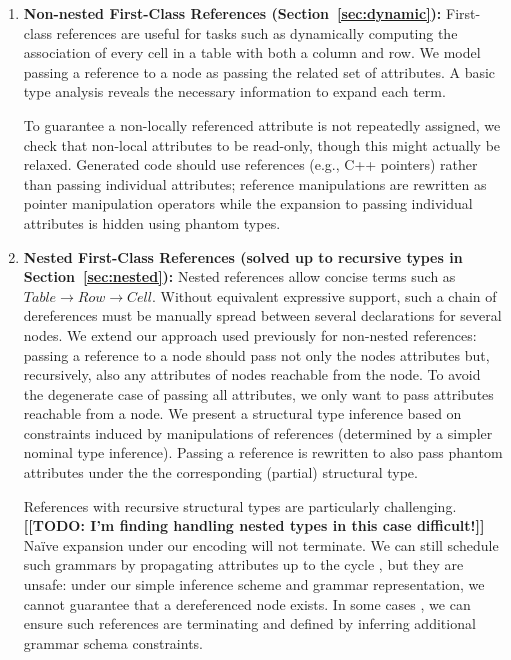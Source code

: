 \begin{enumerate}

\item \textbf{Non-nested First-Class References (Section~\ref{sec:dynamic}):} First-class references are useful for tasks such as dynamically computing the association of every cell in a table with both a column and row. We model passing a reference to a node as passing the related set of attributes. A basic type analysis reveals the necessary information to expand each term.

To guarantee a non-locally referenced attribute is not repeatedly assigned, we check that non-local attributes to be read-only, though this might actually be relaxed. Generated code should use references (e.g., C++ pointers) rather than passing individual attributes; reference manipulations are rewritten as pointer manipulation operators while the expansion to passing individual attributes is hidden using phantom types.

\item \textbf{Nested First-Class References (solved up to recursive types in Section~\ref{sec:nested}):} Nested references allow concise terms such as $Table \rightarrow Row \rightarrow Cell$. Without equivalent expressive support, such a chain of dereferences must be manually spread between several declarations for several nodes. We extend our approach used previously for non-nested references: passing a reference to a node should pass not only the nodes attributes but, recursively, also any attributes of nodes reachable from the node. To avoid the degenerate case of passing all attributes, we only want to pass attributes reachable from a node. We present a structural type inference based on constraints induced by manipulations of references (determined by a simpler nominal type inference). Passing a reference is rewritten to also pass phantom attributes under the the corresponding (partial) structural type. 

References with recursive structural types are particularly challenging.  \textbf{[[TODO: I'm finding handling nested types in this case difficult!]]} Na\"{i}ve expansion under our encoding will not terminate. We can still schedule such grammars by propagating attributes up to the cycle \text{[[maybe?]]}, but they are unsafe: under our simple inference scheme and grammar representation, we cannot guarantee that a dereferenced node exists. In some cases \text{[[maybe?]]}, we can ensure such references are terminating and defined by inferring additional grammar schema constraints.


\end{enumerate}
